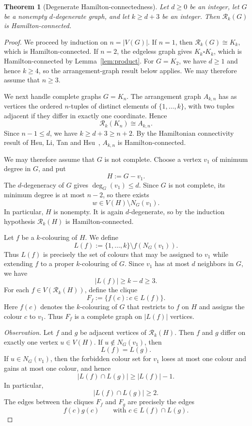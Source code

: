 \documentclass[11pt]{article}
\newtheorem{theorem}{Theorem}[section]
\theoremstyle{remark}
\newcommand{\Rk}{\mathcal R_k}
\numberwithin{equation}{section}
\begin{document}
\begin{theorem}[Degenerate Hamilton-connectedness]\label{thm:degenerate-hc}
Let $d\ge0$ be an integer, let $G$ be a nonempty $d$-degenerate graph,
and let $k\ge d+3$ be an integer. Then $\Rk(G)$ is
Hamilton-connected.
\end{theorem}

\begin{proof}
We proceed by induction on $n=|V(G)|$. If $n=1$, then
$\Rk(G)\cong K_k$, which is Hamilton-connected.
If $n=2$, the edgeless graph gives $K_k\square K_k$, which is
Hamilton-connected by Lemma~\ref{lem:product}.  For $G=K_2$, we have
$d\ge1$ and hence $k\ge4$, so the arrangement-graph result below applies.
We may therefore assume that $n\ge3$.

We next handle complete graphs $G=K_n$. The arrangement
graph $A_{k,n}$ has as vertices the ordered $n$-tuples of distinct
elements of $\{1,\ldots,k\}$, with two tuples adjacent if they differ
in exactly one coordinate. Hence
\[
\Rk(K_n)\cong A_{k,n}.
\]
Since $n-1\le d$, we have $k\ge d+3\ge n+2$.
By the Hamiltonian connectivity result of Hsu, Li, Tan and
Hsu~\cite[Theorem~1]{HLTH04}, $A_{k,n}$ is Hamilton-connected.

We may therefore assume that $G$ is not complete. Choose a vertex
$v_1$ of minimum degree in $G$, and put
\[
H:=G-v_1.
\]
The $d$-degeneracy of $G$ gives $\deg_G(v_1)\le d$. Since $G$ is
not complete, its minimum degree is at most $n-2$, so there exists
\[
w\in V(H)\setminus N_G(v_1).
\]
In particular, $H$ is nonempty. It is again $d$-degenerate, so by
the induction hypothesis $\Rk(H)$ is Hamilton-connected.

Let $f$ be a $k$-colouring of $H$. We define
\[
L(f):=\{1,\ldots,k\}\setminus f(N_G(v_1)).
\]
Thus $L(f)$ is precisely the set of colours that may be assigned to $v_1$ while extending $f$ to a proper $k$-colouring of $G$. 
Since $v_1$ has at most $d$ neighbors in $G$, we have
\[
|L(f)|\geq k-d\geq 3.
\]
For each $f\in V(\Rk(H))$, define the clique
\[
F_f:=\{f(c):c\in L(f)\}.
\]
Here $f(c)$ denotes the $k$-colouring of $G$ that restricts to $f$ on $H$ and assigns the colour $c$ to $v_1$. Thus $F_f$ is a complete graph on $|L(f)|$ vertices.

\smallskip

\noindent\textit{Observation.}
Let $f$ and $g$ be adjacent vertices of $\Rk(H)$. Then $f$ and $g$ differ on exactly one vertex $u\in V(H)$. If $u\notin N_G(v_1)$, then
\[
L(f)=L(g).
\]
If $u\in N_G(v_1)$, then the forbidden colour set for $v_1$ loses at
most one colour and gains at most one colour, and hence
\[
|L(f)\cap L(g)|\geq |L(f)|-1.
\]
In particular,
\[
|L(f)\cap L(g)|\geq 2.
\]
The edges between the cliques $F_f$ and $F_g$ are precisely the edges
\[
f(c)g(c)\qquad \text{with } c\in L(f)\cap L(g).
\]


\end{proof}
\end{document}
